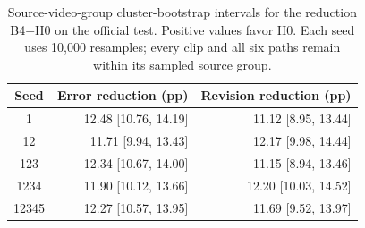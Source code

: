 \begin{table}[t]
\centering
\caption{Source-video-group cluster-bootstrap intervals for the reduction B4$-$H0 on the official test. Positive values favor H0. Each seed uses 10,000 resamples; every clip and all six paths remain within its sampled source group.}
\label{tab:primary-ci}
\begin{tabular}{crr}
\toprule
Seed & Error reduction (pp) & Revision reduction (pp) \\
\midrule
1 & 12.48 [10.76, 14.19] & 11.12 [8.95, 13.44] \\
12 & 11.71 [9.94, 13.43] & 12.17 [9.98, 14.44] \\
123 & 12.34 [10.67, 14.00] & 11.15 [8.94, 13.46] \\
1234 & 11.90 [10.12, 13.66] & 12.20 [10.03, 14.52] \\
12345 & 12.27 [10.57, 13.95] & 11.69 [9.52, 13.97] \\
\bottomrule
\end{tabular}
\end{table}
